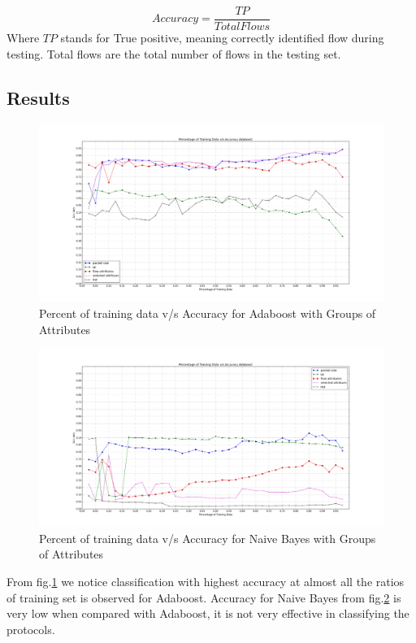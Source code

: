 \documentclass[conference]{IEEEtran}
\begin{document}
\begin{equation}
	Accuracy = \frac{TP}{Total Flows}
\end{equation}
 Where $TP$ stands for True positive, meaning correctly identified flow during testing. Total flows are the total number of flows in the testing set.

\subsection{Results}
\begin{figure}[!t]
	\centering
	\includegraphics[width=7.16in]{adaboost_all_attr_plot.png}
	\caption{Percent of training data v/s Accuracy for Adaboost with Groups of Attributes}
	\label{fig:adaboost_attributes}
\end{figure}

\begin{figure}[!t]
	\centering
	\includegraphics[width=7.16in]{naive_bayes_all_attr_plot.png}
	\caption{Percent of training data v/s Accuracy for Naive Bayes with Groups of Attributes}
	\label{fig:naive_attributes}
\end{figure}
From fig.\ref{fig:adaboost_attributes} we notice classification with highest accuracy at almost all the ratios of training set is observed for Adaboost. Accuracy for Naive Bayes\cite{} from fig.\ref{fig:naive_attributes} is very low when compared with Adaboost, it is not very effective in classifying the protocols.
\end{document}
